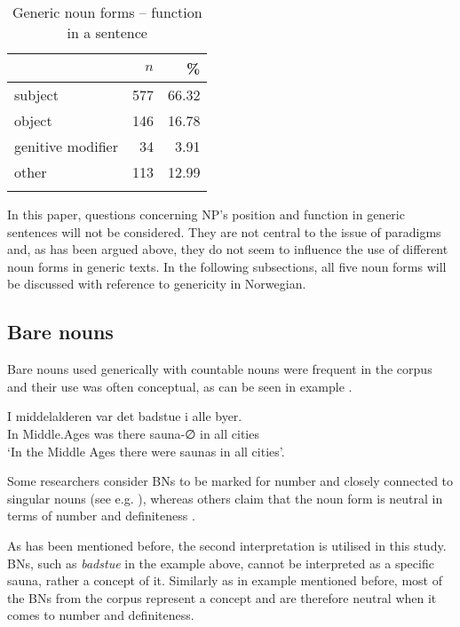 \documentclass[output=paper]{langsci/langscibook}
\begin{document}
\begin{table}
\caption{Generic noun forms -- function in a sentence\label{tab:function}}
\begin{tabular}{lrr} 
\lsptoprule
                        & $n$    & \%  \\ 
   \midrule
   subject              &  577  &   66.32   \\
   object               &  146 &   16.78 \\
   genitive modifier    &  34   &   3.91 \\
   other                &  113 &   12.99 \\
   \lspbottomrule
  \end{tabular}
 \end{table}
 
In this paper, questions concerning NP's position and function in generic sentences will not be considered. They are not central to the issue of paradigms and, as has been argued above, they do not seem to influence the use of different noun forms in generic texts. In the following subsections, all five noun forms will be discussed with reference to genericity in Norwegian.

\subsection{Bare nouns}
\label{sub:BN}
Bare nouns used generically with countable nouns were frequent in the corpus and their use was often conceptual, as can be seen in example .

\ea\label{ex:badstue}
	\gll I middelalderen var det badstue i alle byer. \\
		In Middle.Ages was there sauna-∅ in all cities \\
	\glt `In the Middle Ages there were saunas in all cities'.
\z

Some researchers consider BNs to be marked for number and closely connected to singular nouns (see e.g. \citealp{Borthen2003}), whereas others claim that the noun form is neutral in terms of number and definiteness \citep{Halmoy2016}.

As has been mentioned before, the second interpretation is utilised in this study. BNs, such as \emph{badstue} in the example above, cannot be interpreted as a specific sauna, rather a concept of it. Similarly as in example  mentioned before, most of the BNs from the corpus represent a concept and are therefore neutral when it comes to number and definiteness.
\end{document}
